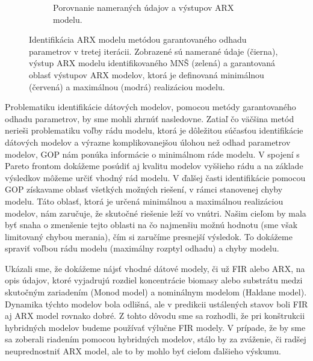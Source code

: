 \begin{figure}
\begin{subfigure}[b]{0.49\textwidth}
		\caption{Porovnanie nameraných údajov a výstupov ARX modelu.}
		\label{fig:ARX_sub_ident}
	\end{subfigure}
\caption{Identifikácia ARX modelu metódou garantovaného odhadu parametrov v tretej iterácii. Zobrazené sú namerané údaje (čierna), výstup ARX modelu identifikovaného MNŠ (zelená) a garantovaná oblasť výstupov ARX modelov, ktorá je definovaná minimálnou (červená) a maximálnou (modrá) realizáciou modelu.}
\label{fig:ARX_sub_identification}
\end{figure}

Problematiku identifikácie dátových modelov, pomocou metódy garantovaného odhadu parametrov, by sme mohli zhrnúť nasledovne. Zatiaľ čo väčšina metód nerieši problematiku voľby rádu modelu, ktorá je dôležitou súčasťou identifikácie dátových modelov a výrazne komplikovanejšou úlohou než odhad parametrov modelov, GOP nám ponúka informácie o minimálnom ráde modelu. V spojení s Pareto frontom dokážeme posúdiť aj kvalitu modelov vyššieho rádu a na základe výsledkov môžeme určiť vhodný rád modelu. V ďalšej časti identifikácie pomocou GOP získavame oblasť všetkých možných riešení, v rámci stanovenej chyby modelu. Táto oblasť, ktorá je určená minimálnou a maximálnou realizáciou modelov, nám zaručuje, že skutočné riešenie leží vo vnútri. Našim cieľom by mala byť snaha o zmenšenie tejto oblasti na čo najmenšiu možnú hodnotu (sme však limitovaný chybou merania), čím si zaručíme presnejší výsledok. To dokážeme spraviť voľbou rádu modelu (maximálny rozptyl odhadu) a chyby modelu.

Ukázali sme, že dokážeme nájsť vhodné dátové modely, či už FIR alebo ARX, na opis údajov, ktoré vyjadrujú rozdiel koncentrácie biomasy alebo substrátu medzi skutočným zariadením (Monod model) a nominálnym modelom (Haldane model). Dynamika týchto modelov bola odlišná, ale v predikcii ustálených stavov boli FIR aj ARX model rovnako dobré. Z tohto dôvodu sme sa rozhodli, že pri konštrukcii hybridných modelov budeme používať výlučne FIR modely. V prípade, že by sme sa zoberali riadením pomocou hybridných modelov, stálo by za zváženie, či radšej neuprednostniť ARX model, ale to by mohlo byť cieľom ďalšieho výskumu.
